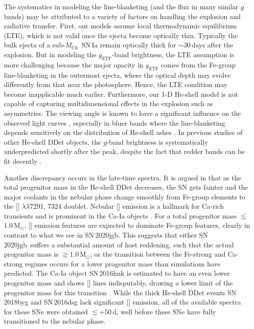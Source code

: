 \documentclass[twocolumn]{aastex631}
\newcommand{\sn}{SN\,2020jgb}
\newcommand{\Mch}{$M_\mathrm{Ch}$}
\newcommand{\Msun}{\mathrm{M_\odot}}
\begin{document}
The systematics in modeling the line-blanketing (and the flux in many similar $g$ bands) may be attributed to a variety of factors on handling the explosion and radiative transfer. First, our models assume local thermodynamic equilibrium (LTE), which is not valid once the ejecta become optically thin. Typically the bulk ejecta of a sub-\Mch\ SN\,Ia remain optically thick for $\sim$30\,days after the explosion. But in modeling the $g_\mathrm{ZTF}$-band brightness, the LTE assumption is more challenging because the major opacity in $g_\mathrm{ZTF}$ comes from the Fe-group line-blanketing in the outermost ejecta, where the optical depth may evolve differently from that near the photosphere. Hence, the LTE condition may become inapplicable much earlier. Furthermore, our 1-D He-shell model is not capable of capturing multidimensional effects in the explosion such as asymmetries. The viewing angle is known to have a significant influence on the observed light curves \citep{Kromer_DD_2010, Sim_2012, Gronow_2020, Shen_2D_2021}, especially in bluer bands where the line-blanketing depends sensitively on the distribution of He-shell ashes \citep{Shen_2D_2021}. In previous studies of other He-shell DDet objects, the $g$-band brightness is systematically underpredicted shortly after the peak, despite the fact that redder bands can be fit decently \citep[e.g.,][]{jiang_16jhr_2017,jacobson-galan_16hnk_2020}.

Another discrepancy occurs in the late-time spectra. It is argued in \citet{polin_nebular_2021} that as the total progenitor mass in the He-shell DDet decreases, the SN gets fainter and the major coolants in the nebular phase change smoothly from Fe-group elements to the [] $\lambda\lambda$7291, 7324 doublet. Nebular [] emission is a hallmark for Ca-rich transients and is prominent in the Ca-Ia objects \citep{galbany_16hnk_2019,De_Ca-rich_2020}. For a total progenitor mass $\lesssim$1.0\,$\Msun$, [] emission features are expected to dominate Fe-group features, clearly in contrast to what we see in \sn. This suggests that either \sn\ suffers a substantial amount of host reddening, such that the actual progenitor mass is $\gtrsim$1.0\,$\Msun$; or the transition between the Fe-strong and Ca-strong regimes occurs for a lower progenitor mass than simulations have predicted.  
The Ca-Ia object SN\,2016hnk is estimated to have an even lower progenitor mass \citep[$\sim$0.87\,$\Msun$;][]{jacobson-galan_16hnk_2020} and shows [] lines indisputably, drawing a lower limit of the progenitor mass for this transition \citep[c.f.,][for discussion on the potential host galaxy extinction on SN\,2016hnk]{galbany_16hnk_2019}. While the thick He-shell DDet events SN\,2018byg and SN\,2016dsg lack significant [] emission, all of the available spectra for these SNe were obtained $\lesssim$$+50$\,d, well before these SNe have fully transitioned to the nebular phase.
\end{document}

